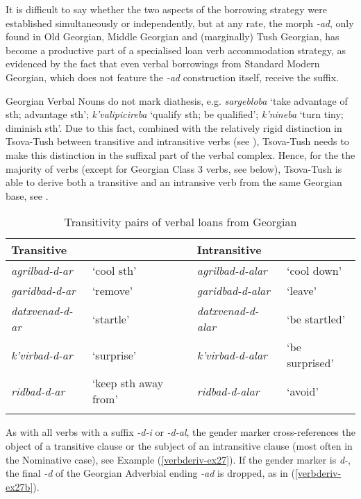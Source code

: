 It is difficult to say whether the two aspects of the borrowing strategy were established simultaneously or independently, but at any rate, the morph \textit{-ad}, only found in Old Georgian, Middle Georgian and (marginally) Tush Georgian, has become a productive part of a specialised loan verb accommodation strategy, as evidenced by the fact that even verbal borrowings from Standard Modern Georgian, which does not feature the \textit{-ad} construction itself, receive the suffix.

Georgian Verbal Nouns do not mark diathesis, e.g. \textit{sargebloba} `take advantage of sth; advantage sth'; \textit{k'valipicireba} `qualify sth; be qualified'; \textit{k'nineba} `turn tiny; diminish sth'. Due to this fact, combined with the relatively rigid distinction in Tsova-Tush between transitive and intransitive verbs (see ), Tsova-Tush needs to make this distinction in the suffixal part of the verbal complex. Hence, for the the majority of verbs (except for Georgian Class 3 verbs, see  below), Tsova-Tush is able to derive both a transitive and an intransive verb from the same Georgian base, see .

\begin{table}
	\begin{tabular}{llll}
    \lsptoprule
		Transitive & & Intransitive & \\
        \midrule
		\textit{agrilbad-d-ar} & `cool sth' & \textit{agrilbad-d-alar} & `cool down' \\
		\textit{garidbad-d-ar} & `remove' & \textit{garidbad-d-alar} & `leave' \\
		\textit{datxvenad-d-ar} & `startle' & \textit{datxvenad-d-alar} & `be startled' \\
		\textit{k'virbad-d-ar} & `surprise' & \textit{k'virbad-d-alar} & `be surprised' \\
		\textit{ridbad-d-ar} &`keep sth away from' &
		\textit{ridbad-d-alar} & `avoid' \\
		\lspbottomrule
	\end{tabular}
	\caption{Transitivity pairs of verbal loans from Georgian}
	\label{table-georgianborrowtrans}
\end{table}

As with all verbs with a suffix \textit{-d-i} or \textit{-d-al}, the gender marker cross-references the object of a transitive clause or the subject of an intransitive clause (most often in the Nominative case), see Example (\ref{verbderiv-ex27}). If the gender marker is \textit{d-}, the final \textit{-d} of the Georgian Adverbial ending \textit{-ad} is dropped, as in (\ref{verbderiv-ex27b}).

